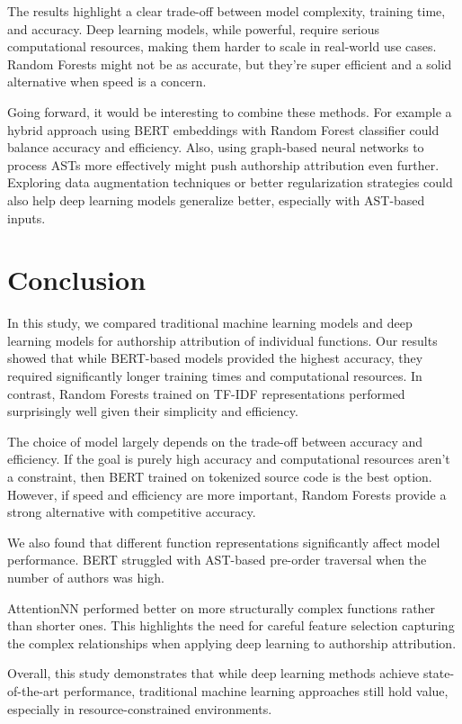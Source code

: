 \documentclass{article}
\begin{document}
The results highlight a clear trade-off between model complexity, training time, and accuracy. Deep learning models, while powerful, 
require serious computational resources, making them harder to scale in real-world use cases. Random Forests might not be as accurate, 
but they’re super efficient and a solid alternative when speed is a concern.

Going forward, it would be interesting to combine these methods. For example a hybrid approach using BERT embeddings with Random Forest 
classifier could balance accuracy and efficiency. Also, using graph-based neural networks to process ASTs more effectively might push 
authorship attribution even further. Exploring data augmentation techniques or better regularization strategies could also help deep 
learning models generalize better, especially with AST-based inputs.

\section{Conclusion}

In this study, we compared traditional machine learning models and deep learning models for authorship attribution of individual functions. 
Our results showed that while BERT-based models provided the highest accuracy, they required significantly longer training times and 
computational resources. In contrast, Random Forests trained on TF-IDF representations performed surprisingly well given their simplicity 
and efficiency.

The choice of model largely depends on the trade-off between accuracy and efficiency. If the goal is purely high accuracy and computational 
resources aren’t a constraint, then BERT trained on tokenized source code is the best option. However, if speed and efficiency are more 
important, Random Forests provide a strong alternative with competitive accuracy.

We also found that different function representations significantly affect model performance. BERT struggled with AST-based pre-order 
traversal when the number of authors was high. 

AttentionNN performed better on more structurally complex functions rather than shorter ones. This highlights the need for 
careful feature selection capturing the complex relationships when applying deep learning to authorship attribution.

Overall, this study demonstrates that while deep learning methods achieve state-of-the-art performance, traditional 
machine learning approaches still hold value, especially in resource-constrained environments.
 

\end{document}
